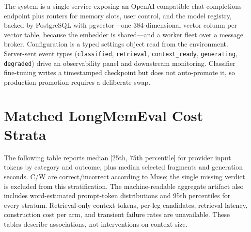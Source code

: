 \documentclass[twoside,11pt]{article}
\begin{document}
The system is a single service exposing an OpenAI-compatible chat-completions endpoint plus routers for memory slots, user control, and the model registry, backed by PostgreSQL with pgvector---one 384-dimensional vector column per vector table, because the embedder is shared---and a worker fleet over a message broker. Configuration is a typed settings object read from the environment. Server-sent event types (\texttt{classified}, \texttt{retrieval}, \texttt{context\_ready}, \texttt{generating}, \texttt{degraded}) drive an observability panel and downstream monitoring. Classifier fine-tuning writes a timestamped checkpoint but does not auto-promote it, so production promotion requires a deliberate swap.

\FloatBarrier
\section{Matched LongMemEval Cost Strata}
\label{app:lme-cost-strata}
The following table reports median [25th, 75th percentile] for provider input tokens by category and outcome, plus median selected fragments and generation seconds. C/W are correct/incorrect according to Muse; the single missing verdict is excluded from this stratification. The machine-readable aggregate artifact also includes word-estimated prompt-token distributions and 95th percentiles for every stratum. Retrieval-only context tokens, per-leg candidates, retrieval latency, construction cost per arm, and transient failure rates are unavailable. These tables describe associations, not interventions on context size.
\small
\end{document}
